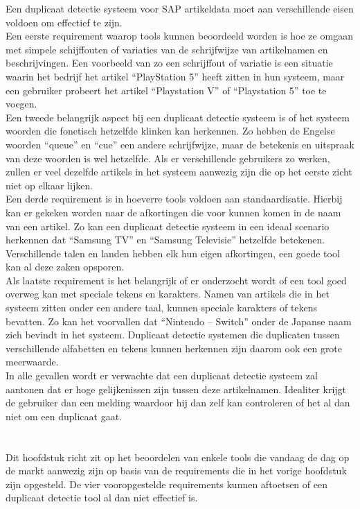 Een duplicaat detectie systeem voor SAP artikeldata moet aan verschillende eisen voldoen om effectief te zijn.
\\Een eerste requirement waarop tools kunnen beoordeeld worden is hoe ze omgaan met simpele schijffouten of variaties van de schrijfwijze van artikelnamen en beschrijvingen. Een voorbeeld van zo een schrijffout of variatie is een situatie waarin het bedrijf het artikel “PlayStation 5” heeft zitten in hun systeem, maar een gebruiker probeert het artikel “Playstation V” of “Playstation 5”  toe te voegen.
\\Een tweede belangrijk aspect bij een duplicaat detectie systeem is of het systeem woorden die fonetisch hetzelfde klinken kan herkennen. Zo hebben de Engelse woorden “queue” en “cue” een andere schrijfwijze, maar de betekenis en uitspraak van deze woorden is wel hetzelfde. Als er verschillende gebruikers zo werken, zullen er veel dezelfde artikels in het systeem aanwezig zijn die op het eerste zicht niet op elkaar lijken.
\\Een derde requirement is in hoeverre tools voldoen aan standaardisatie. Hierbij kan er gekeken worden naar de afkortingen die voor kunnen komen in de naam van een artikel. Zo kan een duplicaat detectie systeem in een ideaal scenario herkennen dat “Samsung TV” en “Samsung Televisie” hetzelfde betekenen. Verschillende talen en landen hebben elk hun eigen afkortingen, een goede tool kan al deze zaken opsporen.
\\Als laatste requirement is het belangrijk of er onderzocht wordt of een tool goed overweg kan met speciale tekens en karakters. Namen van artikels die in het systeem zitten onder een andere taal, kunnen speciale karakters of tekens bevatten. Zo kan het voorvallen dat “Nintendo – Switch” onder de Japanse naam zich bevindt in het systeem. Duplicaat detectie systemen die duplicaten tussen verschillende alfabetten en tekens kunnen herkennen zijn daarom ook een grote meerwaarde. 
\\In alle gevallen wordt er verwachte dat een duplicaat detectie systeem zal aantonen dat er hoge gelijkenissen zijn tussen deze artikelnamen. Idealiter krijgt de gebruiker dan een melding waardoor hij dan zelf kan controleren of het al dan niet om een duplicaat gaat.

\section{}%
\label{sec:tools}
Dit hoofdstuk richt zit op het beoordelen van enkele tools die vandaag de dag op de markt aanwezig zijn op basis van de requirements die in het vorige hoofdstuk zijn opgesteld. De vier vooropgestelde requirements kunnen aftoetsen of een duplicaat detectie tool al dan niet effectief is.

